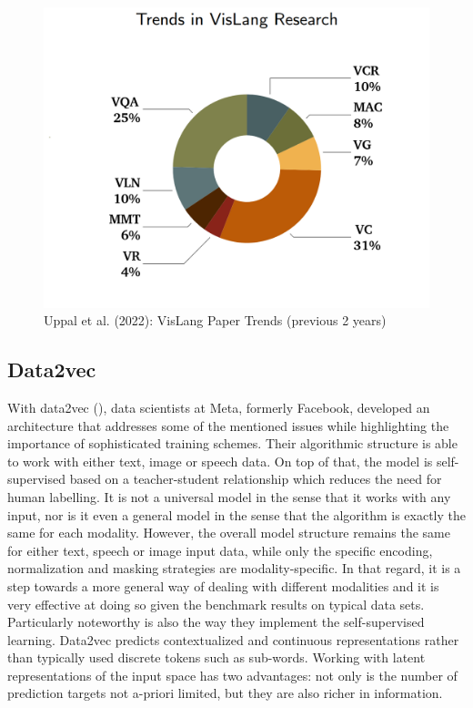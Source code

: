 \documentclass[
]{krantz}
\begin{document}
\begin{figure}

{\centering \includegraphics[width=0.7\linewidth]{figures/05-chapter2/vltasks} 

}

\caption{Uppal et al. (2022): VisLang Paper Trends (previous 2 years)}\label{fig:vltasks}
\end{figure}

\hypertarget{data2vec}{%
\subsection{Data2vec}\label{data2vec}}

With data2vec (\citet{baevski2022data2vec}), data scientists at Meta, formerly Facebook, developed an architecture that addresses some of the mentioned issues while highlighting the importance of sophisticated training schemes. Their algorithmic structure is able to work with either text, image or speech data. On top of that, the model is self-supervised based on a teacher-student relationship which reduces the need for human labelling. It is not a universal model in the sense that it works with any input, nor is it even a general model in the sense that the algorithm is exactly the same for each modality. However, the overall model structure remains the same for either text, speech or image input data, while only the specific encoding, normalization and masking strategies are modality-specific. In that regard, it is a step towards a more general way of dealing with different modalities and it is very effective at doing so given the benchmark results on typical data sets. Particularly noteworthy is also the way they implement the self-supervised learning. Data2vec predicts contextualized and continuous representations rather than typically used discrete tokens such as sub-words. Working with latent representations of the input space has two advantages: not only is the number of prediction targets not a-priori limited, but they are also richer in information.
\end{document}
